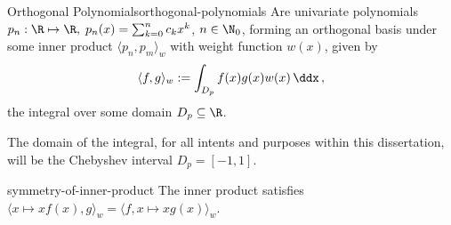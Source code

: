 \begin{definition}{Orthogonal Polynomials}{orthogonal-polynomials}
  Are univariate polynomials
  $p_n: \R \mapsto \R, \; p_n(x) = \sum_{k=0}^{n} c_k x^k$, $n \in \N_0$,
  forming an orthogonal basis under some inner product $\langle p_n, p_m \rangle_w$ with weight function $w(x)$, given by
  $$\langle f, g \rangle_w := \int_{D_p} f(x) g(x) w(x) \,\ddx\,,$$
  the integral over some domain $D_p \subseteq \R$.
\end{definition}

The domain of the integral, for all intents and purposes within this dissertation, will be the Chebyshev interval $D_p = [-1, 1]$.

\begin{remark}{}{symmetry-of-inner-product}
  The inner product satisfies $\langle x\mapsto xf(x), g \rangle_w = \langle f, x \mapsto xg(x)\rangle_w$.
\end{remark}
